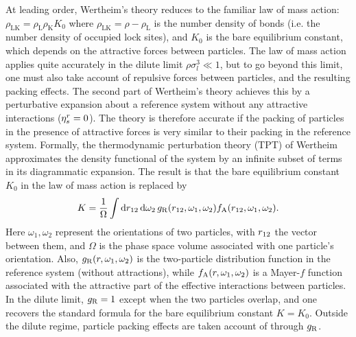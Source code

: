 \documentclass[8.5pt,oneside,onecolumn]{article}
\newcommand{\rhoL}{\rho_\mathrm{L}}
\newcommand{\rhoK}{\rho_\mathrm{K}}
\newcommand{\rhoLK}{\rho_\mathrm{LK}}
\begin{document}
At leading order, Wertheim's theory 
reduces to the familiar law of mass action: $\rhoLK = \rhoL \rhoK K_0$ where $\rhoLK = \rho - \rhoL$ is the number
density of bonds (i.e. the number density of occupied lock sites), and
$ K_0 $ is the bare 
equilibrium constant, which depends on the attractive forces between
particles.  
%
The law of mass action applies quite accurately in the dilute limit $\rho\sigma_l^3\ll 1$, but
to go beyond this limit, one must also take account of
repulsive forces between particles, and the resulting packing
effects. The second part of Wertheim's theory achieves this by a perturbative
expansion about a reference system without any attractive interactions ($\eta_s^r=0$).  
The theory is therefore accurate if the packing of particles in the
presence of attractive forces is very similar to their packing in the
reference system.  Formally, the thermodynamic perturbation theory
(TPT) of Wertheim approximates the density functional of the system by an
infinite subset of terms in its diagrammatic expansion.  The result is
that the bare equilibrium constant $ K_0 $ in the law of mass action is replaced by~\cite{Sciortino2007} 
%
\begin{equation}
K = \frac{1}{\Omega} 
\int \mathrm{d}\boldmath{r}_{12} \, \mathrm{d}\omega_2 \,  g_{\rm R}(\boldmath{r}_{12},\omega_1,\omega_2) 
f_{\rm A}(\boldmath{r}_{12},\omega_1,\omega_2)  .
\label{eq:TPT_K}
\end{equation}
%
Here $\omega_1,\omega_2$ represent the orientations of two particles, with $\boldmath{r}_{12}$ the vector between them,
and $\Omega$ is the phase space volume associated with one particle's orientation.
Also, $g_{\rm R}(\boldmath{r},\omega_1,\omega_2)$ is the two-particle distribution function in the reference
system (without attractions), while $f_{\rm A}(\boldmath{r},\omega_1,\omega_2)$ is a Mayer-$f$ function associated with
the attractive part of the effective interactions between particles.
In the dilute limit, $g_{\rm R}=1$ except when the two particles overlap, and
one recovers the standard formula for the bare equilibrium constant $K=K_0$.  Outside the dilute regime,
particle packing effects are taken account of through $g_{\rm R}$.
\end{document}
